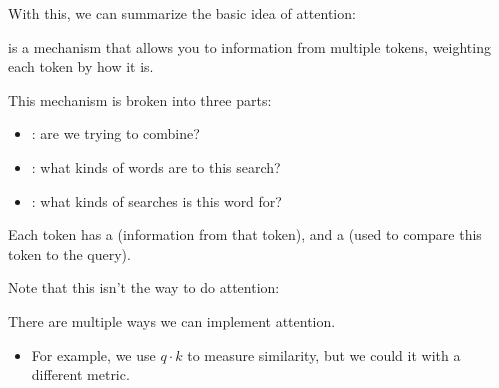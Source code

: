 
        With this, we can summarize the basic idea of attention:\\

        \begin{concept}
             is a mechanism that allows you to  information from multiple tokens, weighting each token by how  it is.

            This mechanism is broken into three parts:

            \begin{itemize}
                \item {}:  are we trying to combine?

                \item {}: what kinds of words are  to this search?

                \item {}: what kinds of searches is this word  for?
            \end{itemize}

            Each token has a  (information from that token), and a  (used to compare this token to the query).
        \end{concept}

        Note that this isn't the  way to do attention:\\

        \begin{clarification}
            There are multiple ways we can implement attention.

            \begin{itemize}
                \item For example, we use $q \cdot k$ to measure similarity, but we could  it with a different metric.
            \end{itemize}
        \end{clarification}


